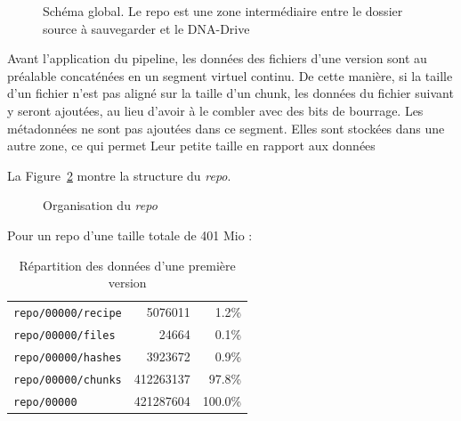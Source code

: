 \documentclass[a4paper]{report}
\begin{document}
\begin{figure}[ht]
\centering


\caption{Schéma global. Le repo est une zone intermédiaire entre le dossier source à sauvegarder et le DNA-Drive}
\label{fig:big-picture}
\end{figure}


Avant l'application du pipeline, les données des fichiers d'une version sont au préalable concaténées en un segment virtuel continu.
De cette manière, si la taille d'un fichier n'est pas aligné sur la taille d'un chunk,
les données du fichier suivant y seront ajoutées, au lieu d'avoir à le combler avec des bits de bourrage.
Les métadonnées ne sont pas ajoutées dans ce segment.
Elles sont stockées dans une autre zone, ce qui permet
Leur petite taille en rapport aux données 

La Figure~\ref{fig:repo-dir-tree} montre la structure du \emph{repo}. 

\begin{figure}
\caption{Organisation du \emph{repo}}
\label{fig:repo-dir-tree}
\end{figure}

Pour un repo d'une taille totale de 401 Mio :

\begin{table}[ht]
\centering
\begin{tabular}{l r r}
\verb|repo/00000/recipe| &   5076011 &   1.2\% \\
\verb|repo/00000/files| &      24664 &   0.1\% \\
\verb|repo/00000/hashes| &   3923672 &   0.9\% \\
\verb|repo/00000/chunks| & 412263137 &  97.8\% \\
\verb|repo/00000| &        421287604 & 100.0\% \\
\end{tabular}
\caption{Répartition des données d'une première version}
\label{fig:repo-data-distribution}
\end{table}
\end{document}
